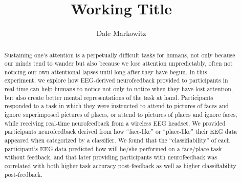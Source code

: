 \documentclass[11pt]{report}
\title{Working Title}
\author{Dale Markowitz}
\begin{document}
\maketitle{}

\begin{abstract}
Sustaining one’s attention is a perpetually difficult tasks for humans, not only because our minds tend to wander but also because we lose attention unpredictably, often not noticing our own attentional lapses until long after they have begun.  In this experiment, we explore how EEG-derived neurofeedback provided to participants in real-time can help humans to notice not only to notice when they have lost attention, but also create better mental representations of the task at hand.  Participants responded to a task in which they were instructed to attend to pictures of faces and ignore superimposed pictures of places, or attend to pictures of places and ignore faces, while receiving real-time neurofeedback from a wireless EEG headset.  We provided participants neurofeedback derived from how “face-like” or “place-like” their EEG data appeared when categorized by a classifier.  We found that the “classifiability” of each participant’s EEG data predicted how will he/she performed on a face/place task without feedback, and that later providing participants with neurofeedback was correlated with both higher task accuracy post-feedback as well as higher classifiability post-feedback.	
\end{abstract}
\end{document}
